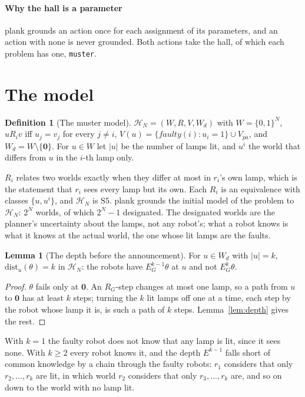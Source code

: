 \documentclass[11pt,a4paper]{article}
\theoremstyle{definition}
\newtheorem{definition}{Definition}
\newtheorem{lemma}{Lemma}
\newcommand{\Eop}[1]{E_{#1}}
\newcommand{\code}[1]{\texttt{\small #1}}
\newcommand{\dist}{\mathrm{dist}}
\newcommand{\faulty}{\mathit{faulty}}
\newcommand{\Hc}{\mathcal{H}}
\newcommand{\some}{\theta}
\newcommand{\zero}{\mathbf{0}}
\begin{document}
\paragraph{Why the hall is a parameter} plank grounds an action once for each
assignment of its parameters, and an action with none is never grounded. Both
actions take the hall, of which each problem has one, \code{muster}.

\section{The model}
\label{sec:model}

\begin{definition}[The muster model]
$\Hc_N = (W, R, V, W_d)$ with $W = \{0,1\}^N$, $u R_i v$ iff $u_j = v_j$ for every
$j \neq i$, $V(u) = \{\faulty(i) : u_i = 1\} \cup V_{\mathit{pa}}$, and
$W_d = W \setminus \{\zero\}$. For $u \in W$ let $|u|$ be the number of lamps
lit, and $u^{i}$ the world that differs from $u$ in the $i$-th lamp only.
\end{definition}

\noindent
$R_i$ relates two worlds exactly when they differ at most in $r_i$'s own lamp,
which is the statement that $r_i$ sees every lamp but its own. Each $R_i$ is an
equivalence with classes $\{u, u^i\}$, and $\Hc_N$ is $\mathrm{S5}$. plank
grounds the initial model of the problem to $\Hc_N$: $2^N$ worlds, of which
$2^N - 1$ designated. The designated worlds are the planner's uncertainty about
the lamps, not any robot's; what a robot knows is what it knows at the actual
world, the one whose lit lamps are the faults.

\begin{lemma}[The depth before the announcement]
\label{lem:hdepth}
For $u \in W_d$ with $|u| = k$, $\dist_u(\some) = k$ in $\Hc_N$: the robots have
$\Eop{G}^{k-1}\some$ at $u$ and not $\Eop{G}^{k}\some$.
\end{lemma}

\begin{proof}
$\some$ fails only at $\zero$. An $R_G$-step changes at most one lamp, so a path
from $u$ to $\zero$ has at least $k$ steps; turning the $k$ lit lamps off one at
a time, each step by the robot whose lamp it is, is such a path of $k$ steps.
Lemma~\ref{lem:depth} gives the rest.
\end{proof}

\noindent
With $k = 1$ the faulty robot does not know that any lamp is lit, since it sees
none. With $k \geq 2$ every robot knows it, and the depth $E^{k-1}$ falls short
of common knowledge by a chain through the faulty robots: $r_1$ considers that
only $r_2, \dots, r_k$ are lit, in which world $r_2$ considers that only
$r_3, \dots, r_k$ are, and so on down to the world with no lamp lit.
\end{document}
